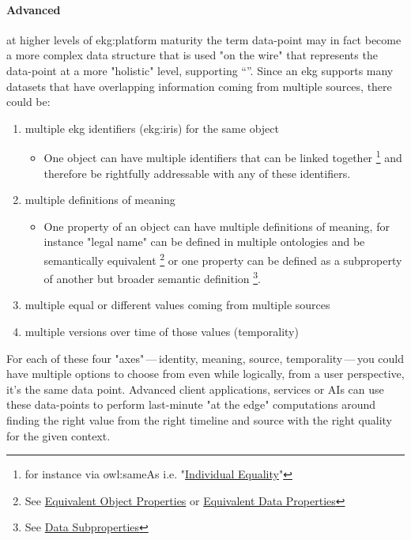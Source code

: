 \paragraph{Advanced} at higher levels of \gls{ekg:platform} maturity the term \gls{data-point} may in fact become a more
complex data structure that is used "on the wire" that represents the \gls{data-point} at a more "holistic" level,
supporting \enquote{}.
Since an \gls{ekg} supports many datasets that have overlapping information coming from multiple sources, there
could be:
\begin{enumerate}
    \item multiple \gls{ekg} identifiers (\glspl{ekg:iri}) for the same object
    \begin{itemize}
        \item One object can have multiple identifiers that can be linked together
              \footnote{%
                  for instance via owl:sameAs i.e.
                  "\href{https://www.w3.org/TR/owl2-syntax/\#Individual_Equality}{Individual Equality}"
              } and therefore be rightfully addressable with any of these identifiers.
    \end{itemize}
    \item multiple definitions of meaning
    \begin{itemize}
        \item One property of an object can have multiple definitions of meaning,
              for instance "legal name" can be defined in multiple ontologies and be semantically equivalent
              \footnote{%
                  See
                  \href{https://www.w3.org/TR/owl2-syntax/\#Equivalent_Object_Properties}{Equivalent Object Properties}
                  or
                  \href{https://www.w3.org/TR/owl2-syntax/\#Equivalent_Data_Properties}{Equivalent Data Properties}
              } or one property can be defined as a subproperty of another but broader semantic definition
              \footnote{%
                  See \href{https://www.w3.org/TR/owl2-syntax/\#Data_Subproperties}{Data Subproperties}
              }.
    \end{itemize}
    \item multiple equal or different values coming from multiple sources

    \item multiple versions over time of those values (temporality)
\end{enumerate}

For each of these four "axes"\,---\,identity, meaning, source, temporality\,---\,you could have multiple
options to choose from even while logically, from a user perspective, it's the same data point.
Advanced client applications, services or AIs can use these \glspl{data-point} to perform last-minute "at the edge"
computations around finding the right value from the right timeline and source with the right quality for the given
context.



